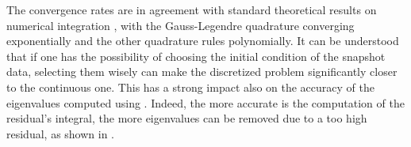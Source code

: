 The convergence rates are in agreement with standard theoretical results on numerical integration \cite{quarteroni_numerical_2007}, with the Gauss-Legendre quadrature converging exponentially and the other quadrature rules polynomially. It can be understood that if one has the possibility of choosing the initial condition of the snapshot data, selecting them wisely can make the discretized problem significantly closer to the continuous one. This has a strong impact also on the accuracy of the eigenvalues computed using . Indeed, the more accurate is the computation of the residual's integral, the more eigenvalues can be removed due to a too high residual, as shown in .

\begin{figure}[h]
\centering
{}
\end{figure}
